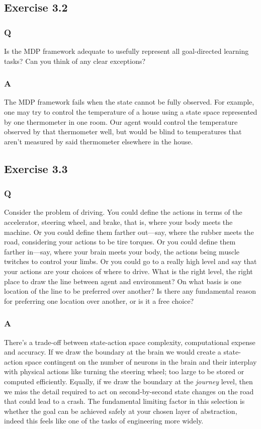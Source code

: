 \subsection{Exercise 3.2}
\subsubsection*{Q}
Is the MDP framework adequate to usefully represent all goal-directed learning tasks? Can you think of any clear exceptions? 

\subsubsection*{A}
The MDP framework fails when the state cannot be fully observed. For example, one may try to control the temperature of a house using a state space represented by one thermometer in one room. Our agent would control the temperature observed by that thermometer well, but would be blind to temperatures that aren't measured by said thermometer elsewhere in the house.

\subsection{Exercise 3.3}
\subsubsection*{Q}
Consider the problem of driving. You could define the actions in terms of the accelerator, steering wheel, and brake, that is, where your body meets the machine. Or you could define them farther out—say, where the rubber meets the road, considering your actions to be tire torques. Or you could define them farther in—say, where your brain meets your body, the actions being muscle twitches to control your limbs. Or you could go to a really high level and say that your actions are your choices of where to drive. What is the right level, the right place to draw the line between agent and environment? On what basis is one location of the line to be preferred over another? Is there any fundamental reason for preferring one location over another, or is it a free choice?

\subsubsection*{A}
There's a trade-off between state-action space complexity, computational expense and accuracy. If we draw the boundary at the brain we would create a state-action space contingent on the number of neurons in the brain and their interplay with physical actions like turning the steering wheel; too large to be stored or computed efficiently. Equally, if we draw the boundary at the \textit{journey} level, then we miss the detail required to act on second-by-second state changes on the road that could lead to a crash. The fundamental limiting factor in this selection is whether the goal can be achieved safely at your chosen layer of abstraction, indeed this feels like one of the tasks of engineering more widely.

